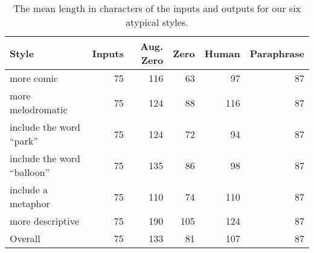 \begin{table*}[]
    \caption{The mean length in characters of the inputs and outputs for our six atypical styles.}
    \label{tab:lengths}
    \centering
    \small
    \begin{tabular}{l|r|rrrr}
    \toprule
    Style & Inputs & Aug. Zero & Zero & Human & Paraphrase \\
    \hline
        more comic &75&116&63&97&87\\
        more melodromatic &75&124&88&116&87 \\
        include the word ``park'' &75&124&72&94&87\\
        include the word ``balloon'' &75&135&86&98&87\\
        include a metaphor &75&110&74&110&87 \\
        more descriptive &75&190&105&124&87\\
        \hline
        Overall &75&133&81&107&87 \\
        \bottomrule
    \end{tabular}
\end{table*}